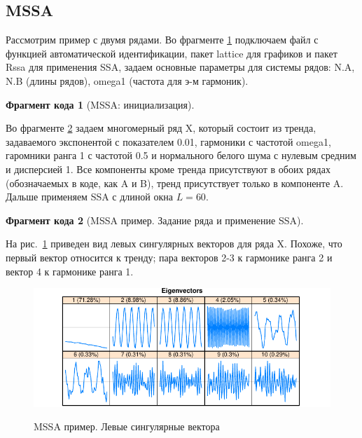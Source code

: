 \documentclass[specialist,
               substylefile = spbu.rtx,
               subf,href,colorlinks=true, 12pt]{disser}
\newtheorem{fragment}{Фрагмент кода}[section]
\newcommand{\bfgh}{\begin{figure}[!htbp]}
\newcommand{\efg}{\end{figure}}
\begin{document}
\subsection{MSSA}
Рассмотрим пример с двумя рядами. Во фрагменте \ref{frag:mssa_init} подключаем файл с функцией автоматической идентификации, пакет lattice для графиков и пакет Rssa для применения SSA, задаем основные параметры для системы рядов: N.A, N.B (длины рядов), omega1 (частота для э-м гармоник).
\begin{fragment}[MSSA: инициализация]
\label{frag:mssa_init}

\end{fragment}
Во фрагменте \ref{frag:mssa_series} задаем многомерный ряд X, который состоит из тренда, задаваемого экспонентой с показателем 0.01, гармоники с частотой omega1, гаромники ранга 1 с частотой 0.5 и нормального белого шума с нулевым средним и дисперсией 1. Все компоненты кроме тренда присутствуют в обоих рядах (обозначаемых в коде, как A и B), тренд присутствует только в компоненте A.
Дальше применяем SSA с длиной окна $L=60$.
\begin{fragment}[MSSA пример. Задание ряда и применение SSA]
\label{frag:mssa_series}

\end{fragment}
На рис.~\ref{fig:mssa_vectors} приведен вид левых сингулярных векторов для ряда X. Похоже, что первый вектор относится к тренду; пара векторов 2-3 к гармонике ранга 2 и вектор 4 к гармонике ранга 1.
\bfgh
        \begin{center}
{\includegraphics[width=4.5in]{mssa_vectors}}
        \end{center}
        \caption{MSSA пример. Левые сингулярные вектора}
        \label{fig:mssa_vectors}
\efg
\end{document}
